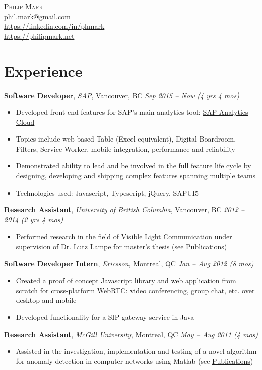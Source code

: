 \documentclass[letterpaper]{article}
\newcommand{\contact}[4]{
  \begin{center}
    {\LARGE \textsc {#1}}\\ \smallskip
    {\href{mailto:#2}{#2}}\\ \smallskip
    {\url{https://#3}}\\ \smallskip
    {\url{https://#4}}\\ \medskip
  \end{center}
}
\newcommand{\jobtitle}[4]{
  \textbf{#1}, \emph{#2}, {#3} \hfill \emph{#4}\\
}
\newenvironment{jobdescription}{
  \vspace{-4pt}
  \begin{itemize}
  \setlength{\itemsep}{2pt}
  \setlength{\parskip}{0pt}
  \setlength{\parsep}{0pt}
}{\end{itemize}}
\begin{document}

\contact{Philip Mark}{phil.mark@gmail.com}{linkedin.com/in/phmark}
{philipmark.net}

\section*{Experience}
\jobtitle{Software Developer}{SAP}{Vancouver, BC}{Sep 2015 -- Now (4 yrs 4 mos)}
\begin{jobdescription}
  \item Developed front-end features for SAP's main analytics tool: 
  \href{https://www.sap.com/canada/products/cloud-analytics.html}{SAP Analytics Cloud}
  \item Topics include web-based Table (Excel equivalent), Digital Boardroom, Filters, Service Worker, mobile integration, performance and reliability
  \item Demonstrated ability to lead and be involved in the full feature life
  cycle by designing, developing and shipping complex features spanning multiple teams
  \item Technologies used: Javascript, Typescript, jQuery, SAPUI5
\end{jobdescription}

\jobtitle{Research Assistant}{University of British Columbia}{Vancouver,
BC}{2012 -- 2014 (2 yrs 4 mos)}
\begin{jobdescription}
  \item Performed research in the field of Visible Light Communication under
  supervision of Dr. Lutz Lampe for master's thesis (see 
  \hyperlink{sec:publications}{Publications})
\end{jobdescription}

\jobtitle{Software Developer Intern}{Ericsson}{Montreal, QC}{Jan -- Aug 2012 (8
mos)}
\begin{jobdescription}
  \item Created a proof of concept Javascript library and web application from
  scratch for cross-platform WebRTC: video conferencing, group chat, etc. over
  desktop and mobile
  \item Developed functionality for a SIP gateway service in Java
\end{jobdescription}

\jobtitle{Research Assistant}{McGill University}{Montreal, QC}{May --
Aug 2011 (4 mos)}
\begin{jobdescription}
  \item Assisted in the investigation, implementation and testing of a novel
  algorithm for anomaly detection in computer networks using Matlab (see
  \hyperlink{sec:publications}{Publications})
\end{jobdescription}
\end{document}
